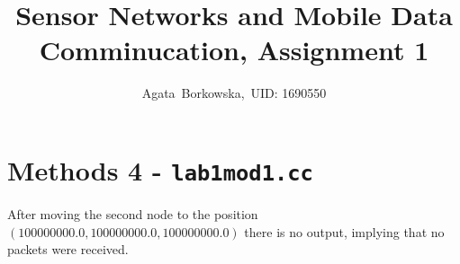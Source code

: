 \documentclass[11pt,journal]{article}
\begin{document}
	\title{Sensor Networks and Mobile Data Comminucation, Assignment 1}
	
	\author{Agata~Borkowska,~UID: 1690550}%
	



	
	
	\maketitle
	
	
	
	
	
	
	
	\section{Methods 4 - \texttt{lab1mod1.cc}}
	After moving the second node to the position $(100000000.0, 100000000.0, 100000000.0)$ there is no output, implying that no packets were received.
	
\end{document}
